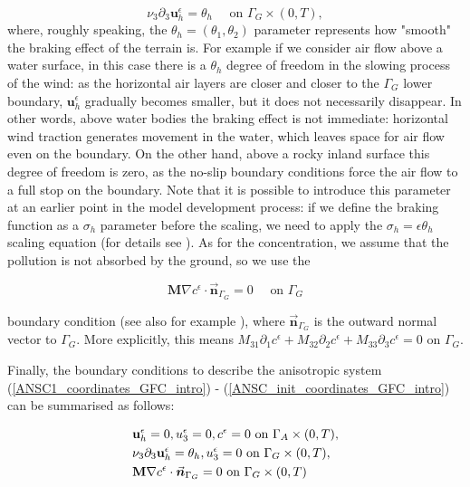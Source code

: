 \documentclass[12pt]{report}
\numberwithin{theorem}{chapter}
\numberwithin{corollary}{chapter}
\numberwithin{lemma}{chapter}
\numberwithin{remark}{chapter}
\numberwithin{definition}{chapter}
\numberwithin{prop}{chapter}
\begin{document}
\begin{itemize}
    \begin{equation}
      \nu_3 \partial_3 \mathbf{u}^\epsilon_h = \theta_h \quad \text{ on } \Gamma_G \times (0,T),
    \end{equation}
%
where, roughly speaking, the $\theta_h = (\theta_1, \theta_2)$ parameter represents how "smooth" the braking effect of the terrain is. For example if we consider air flow above a water surface, in this case there is a $\theta_h$ degree of freedom in the slowing process of the wind: as the horizontal air layers are closer and closer to the $\Gamma_G$ lower boundary, $\mathbf{u}_h^\epsilon$ gradually becomes smaller, but it does not necessarily disappear. In other words, above water bodies the braking effect is not immediate: horizontal wind traction generates movement in the water, which leaves space for air flow even on the boundary. On the other hand, above a rocky inland surface this degree of freedom is zero, as the no-slip boundary conditions force the air flow to a full stop on the boundary. Note that it is possible to introduce this parameter at an earlier point in the model development process: if we define the braking function as a $\sigma_h$ parameter before the scaling, we need to apply the $\sigma_h = \epsilon \theta_h$ scaling equation (for details see \cite{azerad2001mathematical}). As for the concentration, we assume that the pollution is not absorbed by the ground, so we use the
    
    $$\mathbf{M} \nabla c^\epsilon \cdot \vec{\boldsymbol{n}}_{\Gamma_G} = 0 \quad \text{ on } \Gamma_G$$
    
    boundary condition (see also for example \cite{yeh1975three}), where $\vec{\boldsymbol{n}}_{\Gamma_G}$ is the outward normal vector to $\Gamma_G$. More explicitly, this means $M_{31}\partial_1 c^\epsilon + M_{32} \partial_2 c^\epsilon + M_{33} \partial_3 c^\epsilon = 0$ on $\Gamma_G.$
  
\end{itemize}
  
Finally, the boundary conditions to describe the anisotropic system (\ref{ANSC1_coordinates_GFC_intro}) - (\ref{ANSC_init_coordinates_GFC_intro}) can be summarised as follows:

\begin{equation} \label{ANSC_bc_coordinates_GFC_intro}
  \begin{split}
    & \mathbf{u}^\epsilon_h = 0, u^\epsilon_3 = 0, c^\epsilon = 0 \text{ on } \Gamma_A \times (0,T), \\
    & \nu_3 \partial_3 \mathbf{u}^\epsilon_h = \theta_h, u^\epsilon_3 = 0 \text{ on } \Gamma_G \times (0,T), \\
    & \mathbf{M} \nabla c^\epsilon \cdot \vec{\boldsymbol{n}}_{\Gamma_G} = 0 \text{ on } \Gamma_G \times (0,T)
   \end{split} \raisetag{40pt}
\end{equation}
\end{document}

